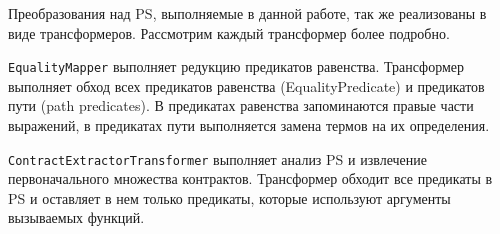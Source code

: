 Преобразования над PS, выполняемые в данной работе, так же реализованы в виде трансформеров. Рассмотрим каждый трансформер более подробно.

\texttt{EqualityMapper} выполняет редукцию предикатов равенства. Трансформер выполняет обход всех предикатов равенства (EqualityPredicate) и предикатов пути (path predicates). В предикатах равенства запоминаются правые части выражений, в предикатах пути выполняется замена термов на их определения.

\texttt{ContractExtractorTransformer} выполняет анализ PS и извлечение первоначального множества контрактов. Трансформер обходит все предикаты в PS и оставляет в нем только предикаты, которые используют аргументы вызываемых функций.